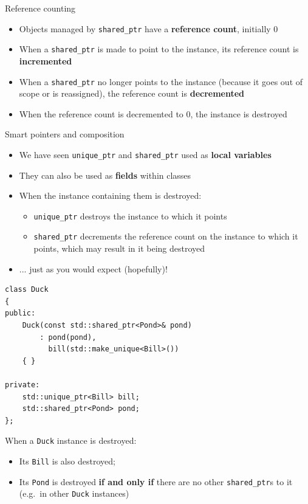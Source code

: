 \begin{frame}{Reference counting}
    \begin{itemize}
        \item Objects managed by \lstinline{shared_ptr} have a \textbf{reference count}, initially 0
        \item When a \lstinline{shared_ptr} is made to point to the instance,
            its reference count is \textbf{incremented}
        \item When a \lstinline{shared_ptr} no longer points to the instance
            (because it goes out of scope or is reassigned),
            the reference count is \textbf{decremented}
        \item When the reference count is decremented to 0,
            the instance is destroyed
    \end{itemize}
\end{frame}

\begin{frame}{Smart pointers and composition}
    \begin{itemize}
        \item We have seen \lstinline{unique_ptr} and \lstinline{shared_ptr} used as
            \textbf{local variables}
        \item They can also be used as \textbf{fields} within classes
        \item When the instance containing them is destroyed:
            \begin{itemize}
                \item \lstinline{unique_ptr} destroys the instance to which it points
                \item \lstinline{shared_ptr} decrements the reference count on the instance 
                    to which it points, which may result in it being destroyed
            \end{itemize}
        \item ... just as you would expect (hopefully)!
    \end{itemize}
\end{frame}

\begin{frame}[fragile]
    \begin{lstlisting}
class Duck
{
public:
    Duck(const std::shared_ptr<Pond>& pond)
        : pond(pond),
          bill(std::make_unique<Bill>())
    { }
    
private:
    std::unique_ptr<Bill> bill;
    std::shared_ptr<Pond> pond;
};
    \end{lstlisting}
    When a \lstinline{Duck} instance is destroyed:
    \begin{itemize}
        \item Its \lstinline{Bill} is also destroyed;
        \item Its \lstinline{Pond} is destroyed \textbf{if and only if} there are no other
            \lstinline{shared_ptr}s to it (e.g.\ in other \lstinline{Duck} instances)
    \end{itemize}
\end{frame}

